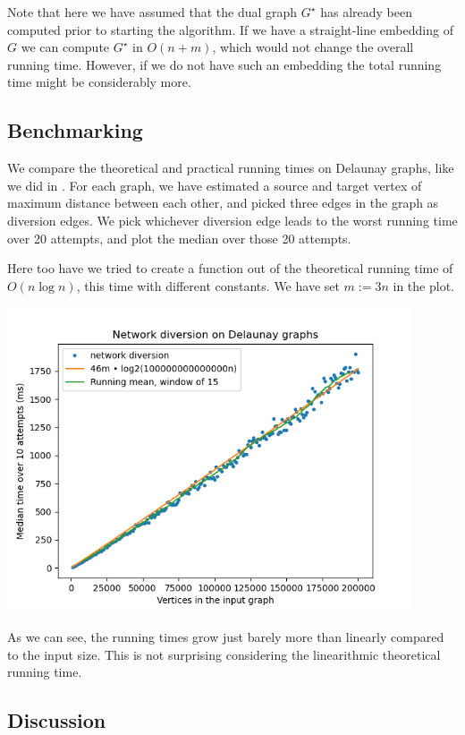 Note that here we have assumed that the dual graph $G^\star$ has already been computed prior to starting the algorithm. If we have a straight-line embedding of $G$ we can compute $G^\star$ in $O(n+m)$, which would not change the overall running time. However, if we do not have such an embedding the total running time might be considerably more.

\subsection{Benchmarking}
We compare the theoretical and practical running times on Delaunay graphs, like we did in . For each graph, we have estimated a source and target vertex of maximum distance between each other, and picked three edges in the graph as diversion edges. We pick whichever diversion edge leads to the worst running time over 20 attempts, and plot the median over those 20 attempts.

Here too have we tried to create a function out of the theoretical running time of $O(n \log n)$, this time with different constants. We have set $m := 3n$ in the plot.

\includegraphics[width=12cm]{figures/bench_plots/network diversion.png}

As we can see, the running times grow just barely more than linearly compared to the input size. This is not surprising considering the linearithmic theoretical running time.



\subsection{Discussion}
